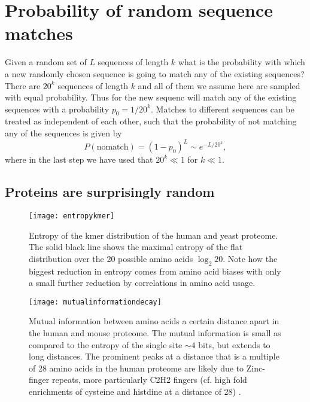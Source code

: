 \documentclass[superscriptaddress,twocolumn,pre]{revtex4}
\newcommand{\<}{\langle}
\renewcommand{\>}{\rangle}
\begin{document}
\section{Probability of random sequence matches}
\label{secsequencematching}
Given a random set of $L$ sequences of length $k$ what is the probability with which a new randomly chosen sequence is going to match any of the existing sequences?
There are $20^k$ sequences of length $k$ and all of them we assume here are sampled with equal probability. Thus for the new sequenc will match any of the existing sequences with a probability $p_0 = 1/20^k$. Matches to different sequences can be treated as independent of each other, such that the probability of not matching any of the sequences is given by
\begin{equation}
    P(\mathrm{no match}) = (1-p_0)^L \sim e^{-L / 20^k},
\end{equation}
where in the last step we have used that $20^k \ll 1$ for $k \ll 1$.




\subsection{Proteins are surprisingly random}

\begin{figure}
    \texttt{[image: entropykmer]}
    \caption{Entropy of the kmer distribution of the human and yeast proteome. The solid black line shows the maximal entropy of the flat distribution over the 20 possible amino acids $\log_2 20$. Note how the biggest reduction in entropy comes from amino acid biases with only a small further reduction by correlations in amino acid usage.
    \label{figentropykmer}
    }
\end{figure}


\begin{figure}
    \texttt{[image: mutualinformationdecay]}
    \caption{Mutual information between amino acids a certain distance apart in the human and mouse proteome. The mutual information is small as compared to the entropy of the single site $\sim 4$ bits, but extends to long distances. The prominent peaks at a distance that is a multiple of 28 amino acids in the human proteome are likely due to Zinc-finger repeats, more particularly C2H2 fingers (cf. high fold enrichments of cysteine and histdine at a distance of 28) \cite{Krishna2003}. 
    \label{figmutualinformationdecay}
    }
\end{figure}
\end{document}
